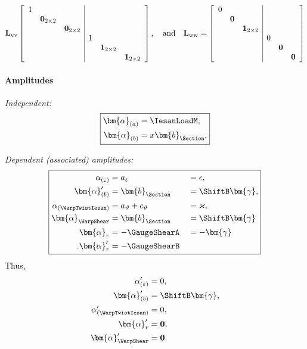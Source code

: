 $$
\mathbf{L}_{\rm vv}\left[\begin{array}{lll|llll}
1 & & & & & \\
& \mathbf{0}_{2\times 2} & & & & \\
& & \mathbf{0}_{2\times 2} & & & \\
& & & 1 & & \\
& & & & \mathbf{1}_{2\times 2} & \\
& & & & & \mathbf{1}_{2\times 2}
\end{array}\right],
\quad\text{and}\quad
\mathbf{L}_{\rm ww} = \left[\begin{array}{lll|llll}
0 & & & & \\
& \mathbf{0} & & & \\
& & \mathbf{1}_{2\times 2} & & \\
&& & 0 & & \\
&& & & \mathbf{0} & \\
&& & & & \mathbf{0}
\end{array}\right]
$$


\paragraph{Amplitudes}
\emph{Independent:}
\[
\boxed{
\begin{aligned}
\bm{\alpha}_{(a)}&=\IesanLoadM,\\
\bm{\alpha}_{(b)}&
=x\bm{b}_{\Section},\\
\end{aligned}
}
\]

\emph{Dependent (associated) amplitudes:}
\begin{equation}
\boxed{
\begin{aligned}
\alpha_{(\varepsilon)}&=a_\varepsilon&&=\epsilon,\\
\bm{\alpha}_{(b)}'&
=\bm{b}_{\Section}&&=\ShiftB\bm{\gamma},\\
\alpha_{(\WarpTwistIesan)}&=a_\vartheta+c_\vartheta&&=\varkappa,\\
\bm{\alpha}_{\WarpShear}&=\bm{b}_{\Section}&&=\ShiftB\bm{\gamma} \\
\bm{\alpha}_{r}&=-\GaugeShearA  &&=-\bm{\gamma}\\.
\bm{\alpha}_{r}'&=-\GaugeShearB
\end{aligned}
}
\label{eq:identify-alpha-ii}
\end{equation}
Thus, 
\begin{equation}
\begin{aligned}
\alpha_{(\varepsilon)}'&=0,\\
\bm{\alpha}_{(b)}'&=\ShiftB\bm{\gamma},\\
\alpha_{(\WarpTwistIesan)}'&=0,\\
\bm{\alpha}_{r}' &=\mathbf{0},\\
\bm{\alpha}_{\WarpShear}'&=\mathbf{0}.
\end{aligned}
\label{eq:identify-alpha-prime-ii}
\end{equation}

